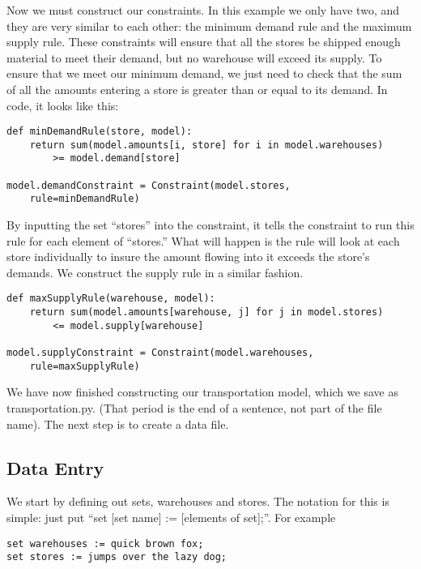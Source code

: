 \documentclass{article}
\begin{document}
Now we must construct our constraints.  In this example we only have two, and they are very similar to each other: the minimum demand rule and the maximum supply rule.  These constraints will ensure that all the stores be shipped enough material to meet their demand, but no warehouse will exceed its supply.  To ensure that we meet our minimum demand, we just need to check that the sum of all the amounts entering a store is greater than or equal to its demand.  In code, it looks like this:

\begin{verbatim}
def minDemandRule(store, model):
    return sum(model.amounts[i, store] for i in model.warehouses) 
        >= model.demand[store]

model.demandConstraint = Constraint(model.stores, 
    rule=minDemandRule)
\end{verbatim}

\noindent
By inputting the set ``stores'' into the constraint, it tells the constraint to run this rule for each element of ``stores.''  What will happen is the rule will look at each store individually to insure the amount flowing into it exceeds the store's demands.  We construct the supply rule in a similar fashion.

\begin{verbatim}
def maxSupplyRule(warehouse, model):
    return sum(model.amounts[warehouse, j] for j in model.stores) 
        <= model.supply[warehouse]

model.supplyConstraint = Constraint(model.warehouses, 
    rule=maxSupplyRule)
\end{verbatim}

We have now finished constructing our transportation model, which we save as transportation.py.  (That period is the end of a sentence, not part of the file name).  The next step is to create a data file.

\subsection*{Data Entry}

We start by defining out sets, warehouses and stores.  The notation for this is simple: just put ``set [set name] := [elements of set];''.  For example

\begin{verbatim}
set warehouses := quick brown fox;
set stores := jumps over the lazy dog;
\end{verbatim}
\end{document}
